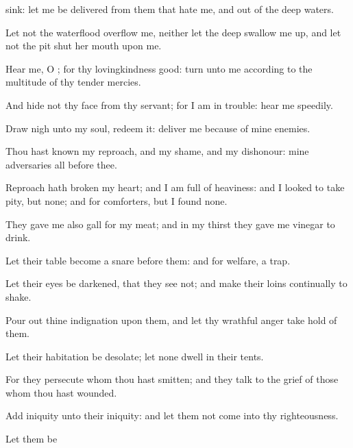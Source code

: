 {sink: let me be
delivered from them that
hate me, and out of the
deep
waters.
\par }{\Q {}Let not the
waterflood
overflow me, neither let the
deep swallow me
up, and let not the
pit
shut her
mouth upon me.
\par }{\Q {}Hear me, O
{}; for thy
lovingkindness
{}
good:
turn unto me according to the
multitude of thy tender
mercies.
\par }{\Q {}And
hide not thy
face from thy
servant; for I am in
trouble:
hear me
speedily.
\par }{\Q {}Draw
nigh unto my
soul,
{}
redeem it:
deliver me because of mine
enemies.
\par }{\Q {}Thou hast
known my
reproach, and my
shame, and my
dishonour: mine
adversaries
{} all before thee.
\par }{\Q {}Reproach hath
broken my
heart; and I am full of
heaviness: and I
looked
{} to take
pity, but
{} none; and for
comforters, but I
found none.
\par }{\Q {}They
gave me also
gall for my
meat; and in my
thirst they gave me
vinegar to
drink.
\par }{\BB \par }{\Q {}Let their
table become a
snare
before them: and
{} for
{}
welfare,
{} a
trap.
\par }{\Q {}Let their
eyes be
darkened, that they
see not; and make their
loins
continually to
shake.
\par }{\Q {}Pour
out thine
indignation upon them, and let thy
wrathful
anger take
hold of them.
\par }{\Q {}Let their
habitation be
desolate;
{} let none
dwell in their
tents.
\par }{\Q {}For they
persecute
{} whom thou hast
smitten; and they
talk to the
grief of those whom thou hast
wounded.
\par }{\Q {}Add
iniquity unto their
iniquity: and let them not
come into thy
righteousness.
\par }{\Q {}Let them be
}
